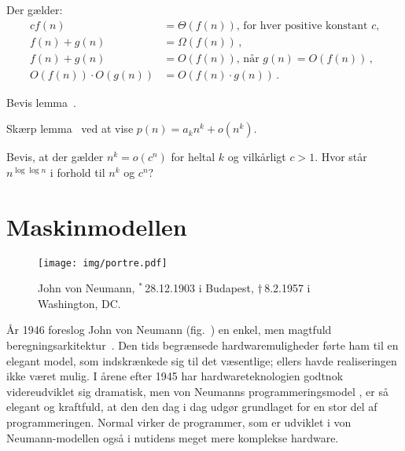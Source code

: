 \begin{lemma}[regneregler]
Der gælder: 
\begin{align*}
cf(n)&=\Theta(f(n))\text{, for hver positive konstant $c$,}\\
f(n)+g(n)&=\Omega(f(n))\,,\\
f(n)+g(n)&=O(f(n))\text{, når }g(n)=O(f(n))\,,\\
O(f(n)) \cdot O(g(n)) &= O(f(n) \cdot g(n))\,.
\end{align*}
\end{lemma} 


\begin{exerc}
Bevis lemma~.
\end{exerc}



\begin{exerc}
Skærp lemma~ ved at vise $p(n)=a_kn^k+o(n^k)$.
\end{exerc}

\begin{exerc} 
Bevis, at der gælder $n^k = o(c^n)$ for heltal $k$ og vilkårligt $c > 1$. 
Hvor står $n^{\log\log n}$ i forhold til $n^k$ og $c^n$?
\end{exerc}

\section{Maskinmodellen}

\begin{wrapfigure}{r}{4cm}
\begin{center}
\texttt{[image: img/portre.pdf]}
\end{center}
\caption{John von Neumann, ${}^*\,$28{.}12{.}1903 i Budapest,
$\dag\,$8{.}2{.}1957 i Washington, DC.}
\end{wrapfigure}

%
%     
År 1946 foreslog John von Neumann  
(fig.~)
%
en enkel, men magtfuld beregningsarkitektur~\cite{Neu45}.
Den tids begrænsede hardwaremuligheder førte ham til en elegant model, som indskrænkede sig til det væsentlige; ellers havde realiseringen ikke været mulig.
I årene efter 1945 har hardwareteknologien godtnok videreudviklet sig dramatisk, men von Neumanns programmeringsmodel
,
er så elegant og kraftfuld, at den den dag i dag udgør grundlaget for en stor del af programmeringen.
Normal virker de programmer, som er udviklet i von Neumann-modellen også i nutidens meget mere komplekse hardware.


